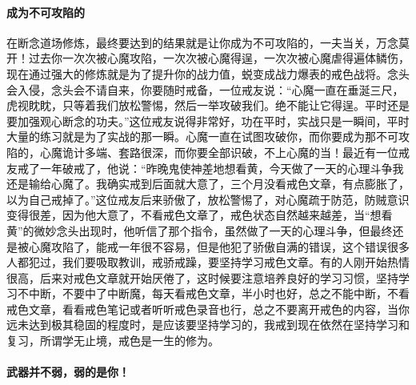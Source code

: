 \paragraph{成为不可攻陷的}

在断念道场修炼，最终要达到的结果就是让你成为不可攻陷的，一夫当关，万念莫开！过去你一次次被心魔攻陷，一次次被心魔得逞，一次次被心魔虐得遍体鳞伤，现在通过强大的修炼就是为了提升你的战力值，蜕变成战力爆表的戒色战将。念头会入侵，念头会不请自来，你要随时戒备，一位戒友说：“心魔一直在垂涎三尺，虎视眈眈，只等着我们放松警惕，然后一举攻破我们。绝不能让它得逞。平时还是要加强观心断念的功夫。”这位戒友说得非常好，功在平时，实战只是一瞬间，平时大量的练习就是为了实战的那一瞬。心魔一直在试图攻破你，而你要成为那不可攻陷的，心魔诡计多端、套路很深，而你要全部识破，不上心魔的当！最近有一位戒友戒了一年破戒了，他说：“昨晚鬼使神差地想看黄，今天做了一天的心理斗争我还是输给心魔了。我确实戒到后面就大意了，三个月没看戒色文章，有点膨胀了，以为自己戒掉了。”这位戒友后来骄傲了，放松警惕了，对心魔疏于防范，防贼意识变得很差，因为他大意了，不看戒色文章了，戒色状态自然越来越差，当“想看黄”的微妙念头出现时，他听信了那个指令，虽然做了一天的心理斗争，但最终还是被心魔攻陷了，能戒一年很不容易，但是他犯了骄傲自满的错误，这个错误很多人都犯过，我们要吸取教训，戒骄戒躁，要坚持学习戒色文章。有的人刚开始热情很高，后来对戒色文章就开始厌倦了，这时候要注意培养良好的学习习惯，坚持学习不中断，不要中了中断魔，每天看戒色文章，半小时也好，总之不能中断，不看戒色文章，看看戒色笔记或者听听戒色录音也行，总之不要离开戒色的内容，当你远未达到极其稳固的程度时，是应该要坚持学习的，我戒到现在依然在坚持学习和复习，所谓学无止境，戒色是一生的修为。

\paragraph{武器并不弱，弱的是你！}

